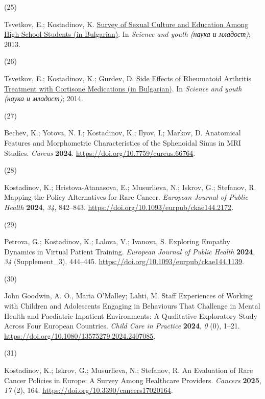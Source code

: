 \documentclass[
  12pt,
  letterpaper,
  DIV=11,
  numbers=noendperiod]{scrartcl}
\newlength{\cslhangindent}
\newlength{\csllabelwidth}
\newenvironment{CSLReferences}[2] %
 {\begin{list}{}{%
  \setlength{\itemindent}{0pt}
  \setlength{\leftmargin}{0pt}
  \setlength{\parsep}{0pt}
  \ifodd #1
   \setlength{\leftmargin}{\cslhangindent}
   \setlength{\itemindent}{-1\cslhangindent}
  \fi
  \setlength{\itemsep}{#2\baselineskip}}}
 {\end{list}}
\newcommand{\CSLLeftMargin}[1]{\parbox[t]{\csllabelwidth}{\strut#1\strut}}
\newcommand{\CSLRightInline}[1]{\parbox[t]{\linewidth - \csllabelwidth}{\strut#1\strut}}
\begin{document}
\begin{CSLReferences}{0}{0}
\CSLLeftMargin{(25) }%
\CSLRightInline{Tsvetkov, E.; Kostadinov, K.
\href{https://asclepius.bg/cnm/wp-content/uploads/2022/05/mnd_2013.pdf}{Survey
of Sexual Culture and Education Among High School Students (in
Bulgarian)}. In \emph{Science and youth (наука и младост)}; 2013.}

\CSLLeftMargin{(26) }%
\CSLRightInline{Tsvetkov, E.; Kostadinov, K.; Gurdev, D.
\href{https://asclepius.bg/cnm/wp-content/uploads/2022/05/sbornik-2014.pdf}{Side
Effects of Rheumatoid Arthritis Treatment with Cortisone Medications (in
Bulgarian)}. In \emph{Science and youth (наука и младост)}; 2014.}

\CSLLeftMargin{(27) }%
\CSLRightInline{Bechev, K.; Yotova, N. I.; Kostadinov, K.; Ilyov, I.;
Markov, D. Anatomical Features and Morphometric Characteristics of the
Sphenoidal Sinus in MRI Studies. \emph{Cureus} \textbf{2024}.
\url{https://doi.org/10.7759/cureus.66764}.}

\CSLLeftMargin{(28) }%
\CSLRightInline{Kostadinov, K.; Hristova-Atanasova, E.; Musurlieva, N.;
Iskrov, G.; Stefanov, R. Mapping the Policy Alternatives for Rare
Cancer. \emph{European Journal of Public Health} \textbf{2024},
\emph{34}, 842--843. \url{https://doi.org/10.1093/eurpub/ckae144.2172}.}

\CSLLeftMargin{(29) }%
\CSLRightInline{Petrova, G.; Kostadinov, K.; Lalova, V.; Ivanova, S.
Exploring Empathy Dynamics in Virtual Patient Training. \emph{European
Journal of Public Health} \textbf{2024}, \emph{34} (Supplement\_3),
444--445. \url{https://doi.org/10.1093/eurpub/ckae144.1139}.}

\CSLLeftMargin{(30) }%
\CSLRightInline{John Goodwin, A. O., Maria O'Malley; Lahti, M. Staff
Experiences of Working with Children and Adolescents Engaging in
Behaviours That Challenge in Mental Health and Paediatric Inpatient
Environments: A Qualitative Exploratory Study Across Four European
Countries. \emph{Child Care in Practice} \textbf{2024}, \emph{0} (0),
1--21. \url{https://doi.org/10.1080/13575279.2024.2407085}.}

\CSLLeftMargin{(31) }%
\CSLRightInline{Kostadinov, K.; Iskrov, G.; Musurlieva, N.; Stefanov, R.
An Evaluation of Rare Cancer Policies in Europe: A Survey Among
Healthcare Providers. \emph{Cancers} \textbf{2025}, \emph{17} (2), 164.
\url{https://doi.org/10.3390/cancers17020164}.}

\end{CSLReferences}
\end{document}
